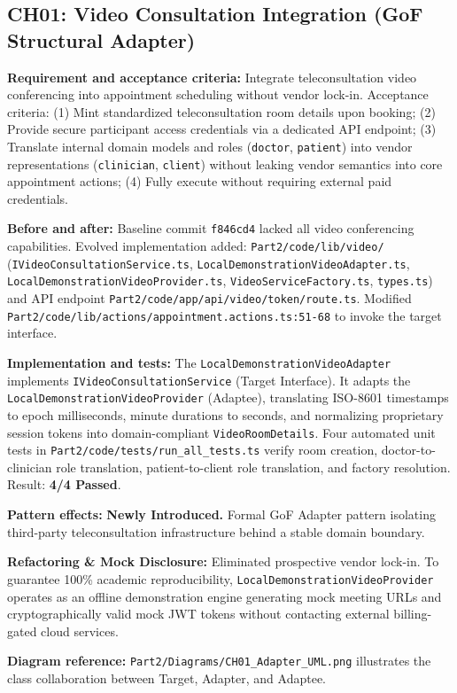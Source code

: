 \documentclass[11pt,a4paper]{article}
\newcommand{\entry}[2]{\textbf{#1:} #2\par}
\begin{document}
\subsection{CH01: Video Consultation Integration (GoF Structural Adapter)}
\entry{Requirement and acceptance criteria}{Integrate teleconsultation video conferencing into appointment scheduling without vendor lock-in. Acceptance criteria: (1) Mint standardized teleconsultation room details upon booking; (2) Provide secure participant access credentials via a dedicated API endpoint; (3) Translate internal domain models and roles (\texttt{doctor}, \texttt{patient}) into vendor representations (\texttt{clinician}, \texttt{client}) without leaking vendor semantics into core appointment actions; (4) Fully execute without requiring external paid credentials.}
\entry{Before and after}{Baseline commit \texttt{f846cd4} lacked all video conferencing capabilities. Evolved implementation added: \texttt{Part2/code/lib/video/} (\texttt{IVideoConsultationService.ts}, \texttt{LocalDemonstrationVideoAdapter.ts}, \texttt{LocalDemonstrationVideoProvider.ts}, \texttt{VideoServiceFactory.ts}, \texttt{types.ts}) and API endpoint \texttt{Part2/code/app/api/video/token/route.ts}. Modified \texttt{Part2/code/lib/actions/appointment.actions.ts:51-68} to invoke the target interface.}
\entry{Implementation and tests}{The \texttt{LocalDemonstrationVideoAdapter} implements \texttt{IVideoConsultationService} (Target Interface). It adapts the \texttt{LocalDemonstrationVideoProvider} (Adaptee), translating ISO-8601 timestamps to epoch milliseconds, minute durations to seconds, and normalizing proprietary session tokens into domain-compliant \texttt{VideoRoomDetails}. Four automated unit tests in \texttt{Part2/code/tests/run\_all\_tests.ts} verify room creation, doctor-to-clinician role translation, patient-to-client role translation, and factory resolution. Result: \textbf{4/4 Passed}.}
\entry{Pattern effects}{\textbf{Newly Introduced.} Formal GoF Adapter pattern isolating third-party teleconsultation infrastructure behind a stable domain boundary.}
\entry{Refactoring \& Mock Disclosure}{Eliminated prospective vendor lock-in. To guarantee 100\% academic reproducibility, \texttt{LocalDemonstrationVideoProvider} operates as an offline demonstration engine generating mock meeting URLs and cryptographically valid mock JWT tokens without contacting external billing-gated cloud services.}
\entry{Diagram reference}{\texttt{Part2/Diagrams/CH01\_Adapter\_UML.png} illustrates the class collaboration between Target, Adapter, and Adaptee.}
\end{document}
